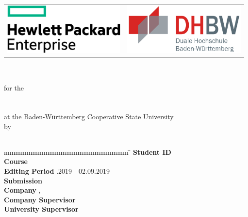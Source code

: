 
\begin{titlepage}
	\begin{longtable}{p{} p{}}
		{\includegraphics[height=2.6cm]{images/hpe.png}} &
		{\includegraphics[height=2.6cm]{images/dhbw.png}}
	\end{longtable}
	\begin{center}
		{\vspace*{12mm}}
		{\LARGE\textbf{\titel}}\\
		\vspace*{4mm}
		\vspace*{12mm}	{\large\textbf{\arbeit}}\\
		\vspace*{3mm}  	for the\\
		\vspace*{3mm} 	{\textbf{\abschluss}}\\
		\vspace*{12mm}	\studiengang\\
		\vspace*{3mm} 	at the Baden-Württemberg Cooperative State University\\
		\vspace*{12mm}	by\\
		\vspace*{3mm} 	{\large\textbf{\autor}}\\
		\vspace*{12mm}
	\end{center}
	\vfill
	\begin{spacing}{1.2}
		\begin{tabbing}
			mmmmmmmmmmmmmmmmmmmmmm     \= \kill
			\textbf{Student ID}  \>  \matrikelnr\\
			\textbf{Course}  \>  \kurs\\
                        \textbf{Editing Period}  .2019 - 02.09.2019\\
                        \textbf{Submission} \> \datumAbgabe\\
			\textbf{Company}      \>  \firma, \firmenort\\
                        \textbf{Company Supervisor}              \>  \betreuer\\
			\textbf{University Supervisor}              \>  \gutachter
		\end{tabbing}
	\end{spacing}
\end{titlepage}
